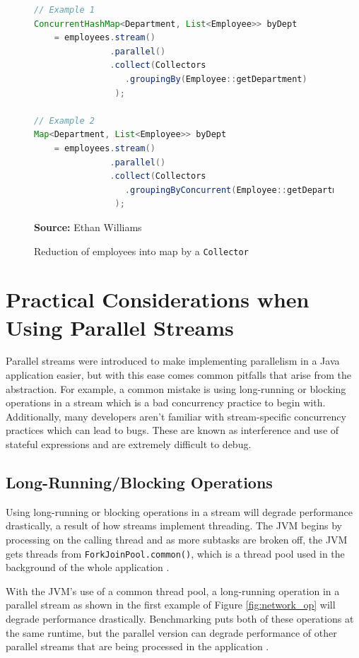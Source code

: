 \documentclass[oneside, 12pt]{article}
\newcommand{\source}[1]{\textbf{Source:} {#1} }
\begin{document}
\begin{figure}[H]
\centering
\begin{lstlisting}[language=Java]
// Example 1
ConcurrentHashMap<Department, List<Employee>> byDept
    = employees.stream()
               .parallel()
               .collect(Collectors
                  .groupingBy(Employee::getDepartment)
                );
                
// Example 2
Map<Department, List<Employee>> byDept
    = employees.stream()
               .parallel()
               .collect(Collectors
                  .groupingByConcurrent(Employee::getDepartment)
                );
\end{lstlisting}
\caption{Reduction of employees into map by a {\tt Collector}}
\source{Ethan Williams}
\label{fig:employee_collection}
\end{figure}

\section{Practical Considerations when Using Parallel Streams}
Parallel streams were introduced to make implementing parallelism in a Java application easier, but with this ease comes common pitfalls that arise from the abstraction. For example, a common mistake is using long-running or blocking operations in a stream which is a bad concurrency practice to begin with. Additionally, many developers aren't familiar with stream-specific concurrency practices which can lead to bugs. These are known as  interference and use of stateful expressions and are extremely difficult to debug.

\subsection{Long-Running/Blocking Operations}
Using long-running or blocking operations in a stream will degrade performance drastically, a result of how streams implement threading. The JVM begins by processing on the calling thread and as more subtasks are broken off, the JVM gets threads from \verb|ForkJoinPool.common()|, which is a thread pool used in the background of the whole application \autocite{dzone_dangers}. 

With the JVM's use of a common thread pool, a long-running operation in a parallel stream as shown in the first example of Figure \ref{fig:network_op} will degrade performance drastically. Benchmarking puts both of these operations at the same runtime, but the parallel version can degrade performance of other parallel streams that are being processed in the application \autocite{benchmark_software}.
\end{document}
